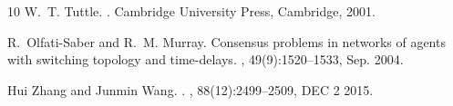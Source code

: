\documentclass[conference]{IEEEtran}
\begin{document}
\begin{thebibliography}{10}
W.~T. Tuttle.
.
\newblock Cambridge University Press, Cambridge, 2001.

R.~Olfati-Saber and R.~M. Murray.
\newblock Consensus problems in networks of agents with switching topology and
  time-delays.
, 49(9):1520--1533, Sep.
  2004.

Hui Zhang and Junmin Wang.
.
, {88}({12}):{2499--2509},
  {DEC 2} {2015}.

\end{thebibliography}
\end{document}
